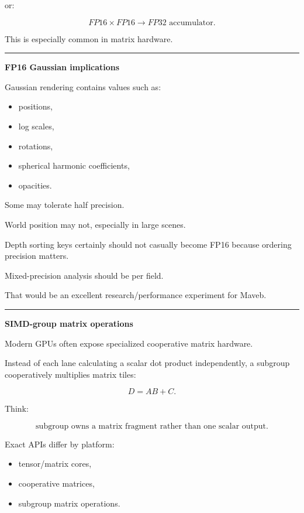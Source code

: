 or:

\[
FP16\times FP16
\rightarrow
FP32\text{ accumulator}.
\]

This is especially common in matrix hardware.

\begin{center}\rule{0.5\linewidth}{0.5pt}\end{center}

\textbf{FP16 Gaussian implications}

Gaussian rendering contains values such as:

\begin{itemize}
\tightlist
\item
  positions,
\item
  log scales,
\item
  rotations,
\item
  spherical harmonic coefficients,
\item
  opacities.
\end{itemize}

Some may tolerate half precision.

World position may not, especially in large scenes.

Depth sorting keys certainly should not casually become FP16 because ordering precision matters.

Mixed-precision analysis should be per field.

That would be an excellent research/performance experiment for Maveb.

\begin{center}\rule{0.5\linewidth}{0.5pt}\end{center}

\textbf{SIMD-group matrix operations}

Modern GPUs often expose specialized cooperative matrix hardware.

Instead of each lane calculating a scalar dot product independently, a subgroup cooperatively multiplies matrix tiles:

\[
D=
AB+C.
\]

Think:

\[
\boxed{
\text{subgroup owns a matrix fragment rather than one scalar output}.
}
\]

Exact APIs differ by platform:

\begin{itemize}
\tightlist
\item
  tensor/matrix cores,
\item
  cooperative matrices,
\item
  subgroup matrix operations.
\end{itemize}

